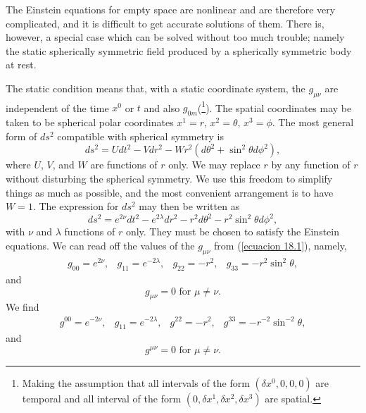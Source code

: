 The Einstein equations for empty space are nonlinear and are therefore very complicated, and it is difficult to get 
accurate solutions of them. There is, however, a special case which can be solved without too much trouble; namely the 
static spherically symmetric field produced by a spherically symmetric body at rest.

The static condition means that, with a static coordinate system, the $g_{\mu\nu}$ are independent of the time $x^0$ or 
$t$ and also $g_{0m}$(\footnote{Making the assumption that all intervals of the form $(\delta x^0,0,0,0)$ are temporal 
and all interval of the form $(0,\delta x^1, \delta x^2, \delta x^3)$ are spatial.}). The spatial coordinates may be 
taken to be spherical polar coordinates $x^1 = r,\,x^2=\theta,\,x^3=\phi$. The most general form of $ds^2$ compatible 
with spherical symmetry is
\[
 ds^2 = U dt^2 - V dr^2 -W r^2(d\theta^2 + \sin^2\theta d\phi^2),
\]
where $U$, $V$, and $W$ are functions of $r$ only. We may replace $r$ by any function of $r$ without disturbing the 
spherical symmetry. We use this freedom to simplify things as much as possible, and the most convenient arrangement is 
to have $W=1$. The expression for $ds^2$ may then be written as 
\begin{equation}
 \label{ecuacion 18.1}
 ds^2 = e^{2\nu} dt^2 - e^{2\lambda} dr^2 - r^2 d\theta^2 - r^2 \sin^2 \theta d\phi^2,
\end{equation}
with $\nu$ and $\lambda$ functions of $r$ only. They must be chosen to satisfy the Einstein equations. We can read off 
the values of the $g_{\mu\nu}$ from (\ref{ecuacion 18.1}), namely,
\[
\begin{array}{cccc}
 g_00 = e^{2\nu}, & g_{11} = e^{-2\lambda}, & g_{22} = -r^2, & g_{33} = - r^2 \sin^2\theta,
\end{array}
\]
and 
\[
g_{\mu\nu} = 0 \mbox{ for } \mu \ne \nu .
\]
We find
\[
   \begin{array}{cccc}
   g^{00} = e^{-2\nu}, & g_{11} = e^{-2\lambda}, & g^{22} = -r^2, &  g^{33} = -r^{-2} \sin^{-2} 
\theta,
   \end{array}
\]
and
\[
 g^{\mu\nu} = 0 \mbox{ for } \mu \ne \nu .
\]

